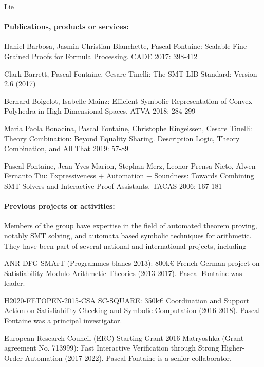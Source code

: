 \begin{sitedescription}{Lie}
\paragraph*{Publications, products or services:}

\begin{compactitem}
\item Haniel Barbosa, Jasmin Christian Blanchette, Pascal Fontaine:
Scalable Fine-Grained Proofs for Formula Processing. CADE 2017: 398-412

\item Clark Barrett, Pascal Fontaine, Cesare Tinelli: The SMT-LIB Standard: Version 2.6 (2017)

\item Bernard Boigelot, Isabelle Mainz:
Efficient Symbolic Representation of Convex Polyhedra in High-Dimensional Spaces. ATVA 2018: 284-299

\item Maria Paola Bonacina, Pascal Fontaine, Christophe Ringeissen, Cesare Tinelli:
Theory Combination: Beyond Equality Sharing. Description Logic, Theory Combination, and All That 2019: 57-89


\item Pascal Fontaine, Jean-Yves Marion, Stephan Merz, Leonor Prensa Nieto, Alwen Fernanto Tiu:
  Expressiveness + Automation + Soundness: Towards Combining SMT Solvers and Interactive Proof Assistants. TACAS 2006: 167-181
\end{compactitem}

\paragraph*{Previous projects or activities:}

Members of the group have expertise in the field of automated theorem proving, notably SMT solving, and automata based symbolic techniques for arithmetic.  They have been part of several national and international projects, including
\begin{compactitem}
\item ANR-DFG SMArT (Programmes blancs 2013): 800k€ French-German project on Satisfiability Modulo Arithmetic Theories (2013-2017).  Pascal Fontaine was leader.
\item H2020-FETOPEN-2015-CSA SC-SQUARE: 350k€ Coordination and Support Action on Satisfiability Checking and Symbolic Computation (2016-2018).  Pascal Fontaine was a principal investigator.
\item European Research Council (ERC) Starting Grant 2016 Matryoshka (Grant
  agreement No. 713999): Fast Interactive Verification through Strong
  Higher-Order Automation (2017-2022).  Pascal Fontaine is a senior
  collaborator.
\end{compactitem}


\end{sitedescription}
